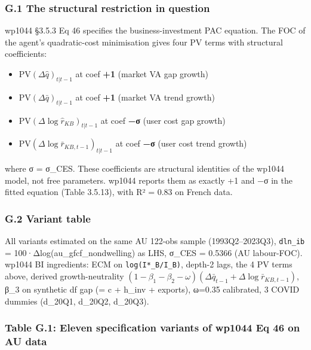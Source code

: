 \documentclass[
]{article}
\providecommand{\tightlist}{%
  \setlength{\itemsep}{0pt}\setlength{\parskip}{0pt}}
\begin{document}
\subsubsection{G.1 The structural restriction in
question}\label{g.1-the-structural-restriction-in-question}

wp1044 §3.5.3 Eq 46 specifies the business-investment PAC equation. The
FOC of the agent's quadratic-cost minimisation gives four PV terms with
structural coefficients:

\begin{itemize}
\tightlist
\item
  \(\mathrm{PV}(\Delta\hat{q})_{t|t-1}\) at coef \textbf{+1} (market VA
  gap growth)
\item
  \(\mathrm{PV}(\Delta\bar{q})_{t|t-1}\) at coef \textbf{+1} (market VA
  trend growth)
\item
  \(\mathrm{PV}(\Delta\log\hat{r}_{KB})_{t|t-1}\) at coef \textbf{−σ}
  (user cost gap growth)
\item
  \(\mathrm{PV}(\Delta\log\bar{r}_{KB,t-1})_{t|t-1}\) at coef
  \textbf{−σ} (user cost trend growth)
\end{itemize}

where σ = σ\_CES. These coefficients are structural identities of the
wp1044 model, not free parameters. wp1044 reports them as exactly +1 and
−σ in the fitted equation (Table 3.5.13), with R² = 0.83 on French data.

\subsubsection{G.2 Variant table}\label{g.2-variant-table}

All variants estimated on the same AU 122-obs sample (1993Q2--2023Q3),
\texttt{dln\_ib} = 100·Δlog(au\_gfcf\_nondwelling) as LHS, σ\_CES =
0.5366 (AU labour-FOC). wp1044 BI ingredients: ECM on
\texttt{log(I*\_B/I\_B)}, depth-2 lags, the 4 PV terms above, derived
growth-neutrality
\((1-\beta_1-\beta_2-\omega)(\Delta\bar{q}_{t-1} + \Delta\log\bar{r}_{KB,t-1})\),
β\_3 on synthetic df gap (= c + h\_inv + exports), ω=0.35 calibrated, 3
COVID dummies (d\_20Q1, d\_20Q2, d\_20Q3).

\subsubsection{Table G.1: Eleven specification variants of wp1044 Eq 46
on AU
data}\label{table-g.1-eleven-specification-variants-of-wp1044-eq-46-on-au-data}
\end{document}
